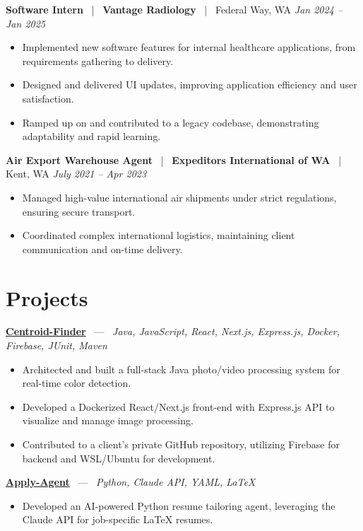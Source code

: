\documentclass[10pt, letterpaper]{article}
\newcommand{\jobhead}[4]{%
  \vspace{5pt}%
  {\bfseries\color{dark}#1}%
  ~{\color{light}|}~%
  {\bfseries\color{navy}#2}%
  ~{\color{light}|}~%
  {\color{light}#3}%
  \hfill{\color{light}\small\textit{#4}}\\[-2pt]%
}
\newcommand{\projhead}[3]{%
  \vspace{5pt}%
  {\bfseries\color{dark}\href{#2}{#1}}%
  ~{\color{light}---}~%
  {\color{light}\small\textit{#3}}\\[-2pt]%
}
\begin{document}
\jobhead{Software Intern}{Vantage Radiology}{Federal Way, WA}{Jan 2024 – Jan 2025}
\begin{itemize}
  \item Implemented new software features for internal healthcare applications, from requirements gathering to delivery.
  \item Designed and delivered UI updates, improving application efficiency and user satisfaction.
  \item Ramped up on and contributed to a legacy codebase, demonstrating adaptability and rapid learning.
\end{itemize}

\jobhead{Air Export Warehouse Agent}{Expeditors International of WA}{Kent, WA}{July 2021 – Apr 2023}
\begin{itemize}
  \item Managed high-value international air shipments under strict regulations, ensuring secure transport.
  \item Coordinated complex international logistics, maintaining client communication and on-time delivery.
\end{itemize}

\section{Projects}

\projhead{Centroid-Finder}{https://github.com/xavierb117/centroid-finder}{Java, JavaScript, React, Next.js, Express.js, Docker, Firebase, JUnit, Maven}
\begin{itemize}
  \item Architected and built a full-stack Java photo/video processing system for real-time color detection.
  \item Developed a Dockerized React/Next.js front-end with Express.js API to visualize and manage image processing.
  \item Contributed to a client's private GitHub repository, utilizing Firebase for backend and WSL/Ubuntu for development.
\end{itemize}

\projhead{Apply-Agent}{https://github.com/timmyd4/apply-agent}{Python, Claude API, YAML, LaTeX}
\begin{itemize}
  \item Developed an AI-powered Python resume tailoring agent, leveraging the Claude API for job-specific LaTeX resumes.
\end{itemize}
\end{document}
